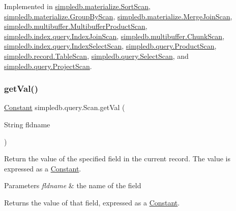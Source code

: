 Implemented in \hyperlink{classsimpledb_1_1materialize_1_1SortScan_a4e8f52b556a029c86480d969f06bb1e0}{simpledb.\+materialize.\+Sort\+Scan}, \hyperlink{classsimpledb_1_1materialize_1_1GroupByScan_a5de9ab1d8e9da876aa5cd7cb3b953f62}{simpledb.\+materialize.\+Group\+By\+Scan}, \hyperlink{classsimpledb_1_1materialize_1_1MergeJoinScan_a75103d6b70f1138aa532abd01e9c436b}{simpledb.\+materialize.\+Merge\+Join\+Scan}, \hyperlink{classsimpledb_1_1multibuffer_1_1MultibufferProductScan_ad79341706c7a797ec6d56dc7c04b9276}{simpledb.\+multibuffer.\+Multibuffer\+Product\+Scan}, \hyperlink{classsimpledb_1_1index_1_1query_1_1IndexJoinScan_adf3610c0e68bc8491ec7d6d887b71a59}{simpledb.\+index.\+query.\+Index\+Join\+Scan}, \hyperlink{classsimpledb_1_1multibuffer_1_1ChunkScan_aa66edd9026c2c2f92015d3d6c2b9c932}{simpledb.\+multibuffer.\+Chunk\+Scan}, \hyperlink{classsimpledb_1_1index_1_1query_1_1IndexSelectScan_ab67c9c8e34fa77975e00d9202075df3b}{simpledb.\+index.\+query.\+Index\+Select\+Scan}, \hyperlink{classsimpledb_1_1query_1_1ProductScan_a2fda3abb7dc55d443791b8e5664ef1e3}{simpledb.\+query.\+Product\+Scan}, \hyperlink{classsimpledb_1_1record_1_1TableScan_af43f30e2489c5cd23566cb60271db331}{simpledb.\+record.\+Table\+Scan}, \hyperlink{classsimpledb_1_1query_1_1SelectScan_a82a4ef8dd0ba1287cfb3bd9f25d01bd2}{simpledb.\+query.\+Select\+Scan}, and \hyperlink{classsimpledb_1_1query_1_1ProjectScan_afaf845b45f703794f37b6c48d68a753a}{simpledb.\+query.\+Project\+Scan}.

\mbox{\label{interfacesimpledb_1_1query_1_1Scan_aca80bca2857c983a88834bf6c01ee5ca}} 
\subsubsection{\texorpdfstring{get\+Val()}{getVal()}}
{\footnotesize\ttfamily \hyperlink{classsimpledb_1_1query_1_1Constant}{Constant} simpledb.\+query.\+Scan.\+get\+Val (\begin{DoxyParamCaption}\item[{String}]{fldname }\end{DoxyParamCaption})}

Return the value of the specified field in the current record. The value is expressed as a \hyperlink{classsimpledb_1_1query_1_1Constant}{Constant}. 
\begin{DoxyParams}{Parameters}
{\em fldname} & the name of the field \\
\hline
\end{DoxyParams}
\begin{DoxyReturn}{Returns}
the value of that field, expressed as a \hyperlink{classsimpledb_1_1query_1_1Constant}{Constant}. 
\end{DoxyReturn}


